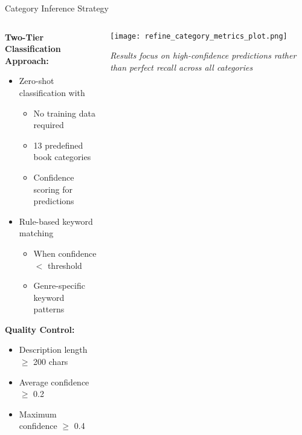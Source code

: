 \begin{frame}{Category Inference Strategy}

\begin{columns}[T]
  \begin{column}{0.50\textwidth}
    \textbf{Two-Tier Classification Approach:}
    \begin{itemize}
      \item {} Zero-shot classification with 
        \begin{itemize}
          \item No training data required
          \item 13 predefined book categories
          \item Confidence scoring for predictions
        \end{itemize}
      \item {} Rule-based keyword matching
        \begin{itemize}
          \item When confidence $<$ threshold
          \item Genre-specific keyword patterns
        \end{itemize}
    \end{itemize}

    \vspace{0.3cm}
    \textbf{Quality Control:}
    \begin{itemize}
      \item Description length $\geq$ 200 chars
      \item Average confidence $\geq$ 0.2
      \item Maximum confidence $\geq$ 0.4
    \end{itemize}
  \end{column}

  \begin{column}{0.45\textwidth}
    \centering
    \texttt{[image: refine\_category\_metrics\_plot.png]}
    
    \vspace{0.1cm}
    \tiny \textit{Results focus on high-confidence predictions rather than perfect recall across all categories}
  \end{column}
\end{columns}

\end{frame}